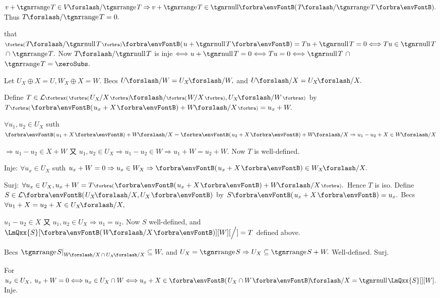 $v+\range T\in V\XSlash \range T\Rightarrow v+\range T\in\Null\Par{T\XSlash{\range T}}.$ Thus $T\XSlash{\range T}=0.$\PfEnd
\SepLine

\NOTICE that $\BigPar{T\XSlash{\null T}}\Par{u+\null T}=Tu+\null T=0\Longleftrightarrow Tu\in{\null T}${\Large${}\cap{}$}${\range T}.$\parSol{}
Now $T\XSlash{\null T}$ is inje $\Longleftrightarrow u+\null T=0\Longleftrightarrow Tu=0 \Longleftrightarrow{\null T}${\Large${}\cap{}$}${\range T}=\zeroSubs.$\PfEnd
\SepLine

Let $U_X\oplus X=U,W_X\oplus X=W.$ Becs $U\XSlash W=U_X\XSlash W,$ and $U\XSlash X=U_X\XSlash X.$\vspace{1pt}\par\quad
Define $T\in\Lm[\XPar]{\BigPar{U_X\hspace{-1pt}\Slash X}\XSlash\BigPar{W\hspace{-1.5pt}\Slash X},U_X\XSlash W}$ by $T\BigPar{\Par{u_x+X}+W\XSlash X}=u_x+W.$\par\quad
$\forall u_1,u_2\in U_X$ suth $\Par{u_1+X}+W\XSlash X=\Par{u_2+X}+W\XSlash X\Rightarrow u_1-u_2+X\in W\XSlash X$\par\quad
$\Rightarrow u_1-u_2\in X+W$ 又 $u_1,u_2\in U_X\Rightarrow u_1-u_2\in W\Rightarrow u_1+W=u_2+W.$ \;Now $T$ is well-defined.\par\quad
Inje: $\forall u_x\in U_X$ suth $u_x+W=0\Rightarrow u_x\in W_X\Rightarrow\Par{u_x+X}\in W_X\XSlash X.$\par\quad
Surj: $\forall u_x\in U_X,u_x+W=T\BigPar{\Par{u_x+X}+W\XSlash X}.$ \;Hence $T$ is iso.\PfEnd\vspace{6pt}\quad
\Or Define $S\in\Lm{U_X\XSlash X,U_X}$ by $S\Par{u_x+X}=u_x.$
Becs $\forall u_1+X=u_2+X\in U_X\XSlash X,$\par\quad
$u_1-u_2\in X$ 又 $u_1,u_2\in U_X\Rightarrow u_1=u_2.$ Now $S$ well-defined, and $\LmQxx{S}[\SmallPar{W\XSlash X}][W][\Big/]=T$ defined above.\par\quad
Becs $\range S\mmid_{W\XSlash X\,\cap\,U_X\XSlash X}\subseteq W,$ and $U_X=\range S\Rightarrow U_X\subseteq\range S+W.$ \;Well-defined. Surj.\par\quad
For $u_x\in U_X,\;u_x+W=0\Longleftrightarrow u_x\in U_X\cap W\Longleftrightarrow u_x+X\in\Par{U_X\cap W}\XSlash X=\null\LmQxx{S}[][W].$ \;Inje.\PfEnd
\SepLine
\ChEnd

